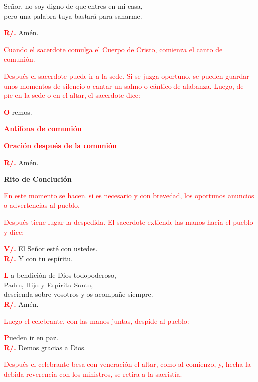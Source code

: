 \documentclass[12pt, letterpaper]{article}
\begin{document}
  \noindent
  \Large Se\~nor, no soy digno de que entres en mi casa,\\ 
  pero una palabra tuya bastar\'a para sanarme.

  \noindent
  \Large {\bfseries \textcolor{red}{R/.}} \hspace{0.5cm} Am\'en.

  \large{\textcolor{red}{Cuando el sacerdote comulga el Cuerpo de Cristo, comienza el canto de comuni\'on.}}

  \large{\textcolor{red}{Despu\'es el sacerdote puede ir a la sede. Si se juzga oportuno, se pueden guardar unos momentos de silencio o cantar un salmo o c\'antico de alabanza. Luego, de pie en la sede o en el altar, el sacerdote dice:}}

  \lettrine[lines=1]{\bfseries \textcolor{red}{O}}{} \Large remos.

  \Large {\bfseries \textcolor{red}{Ant\'ifona de comuni\'on}}

  \Large {\bfseries \textcolor{red}{Oraci\'on despu\'es de la comuni\'on}}

  \noindent
  \Large {\bfseries \textcolor{red}{R/.}} \hspace{0.5cm} Am\'en.

  \clearpage
  
  \begin{center}
    \Huge {\bfseries Rito de Concluci\'on}
  \end{center}

  \large{\textcolor{red}{En este momento se hacen, si es necesario y con brevedad, los oportunos anuncios o advertencias al pueblo.}}

  \large{\textcolor{red}{Despu\'es tiene lugar la despedida. El sacerdote extiende las manos hacia el pueblo y dice:}}

  \noindent
  \Large {\bfseries \textcolor{red}{V/.}} \hspace{0.5cm} El Se\~nor est\'e con ustedes.\\
  \noindent
  \Large {\bfseries \textcolor{red}{R/.}} \hspace{0.5cm} Y con tu esp\'iritu.

  \lettrine[lines=2]{\bfseries \textcolor{red}{L}}{} \Large a bendici\'on de Dios todopoderoso, \\
  Padre, Hijo \Huge{\textcolor{red}{}} \Large y Esp\'iritu Santo, \\
  descienda sobre vosotros y os acompa\~ne siempre.\\
  \noindent
  \Large {\bfseries \textcolor{red}{R/.}} \hspace{0.5cm} Am\'en.

  \large{\textcolor{red}{Luego el celebrante, con las manos juntas, despide al pueblo:}}

  \lettrine[lines=1]{\bfseries \textcolor{red}{P}}{}\Large ueden ir en paz.\\
  \noindent
  \Large {\bfseries \textcolor{red}{R/.}} \hspace{0.5cm} Demos gracias a Dios.

  \large{\textcolor{red}{Despu\'es el celebrante besa con veneraci\'on el altar, como al comienzo, y, hecha la debida reverencia con los ministros, se retira a la sacrist\'ia.}}
\end{document}
